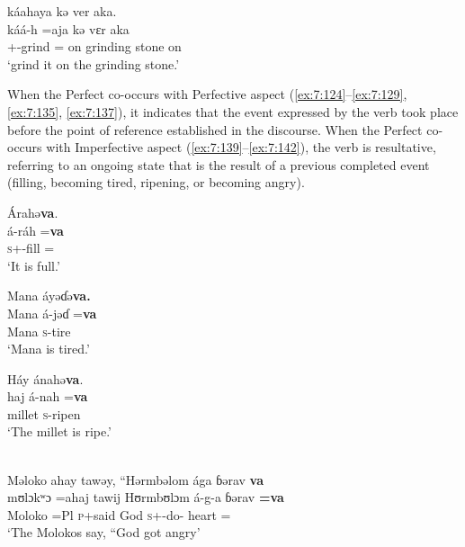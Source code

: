 \medskip
 káahaya  kə  ver  aka.\\
\gll káá-h =aja kə vɛr aka\\
     {\twoS}+{\POT}-grind  ={\PLU}  on  {grinding stone}     on\\
\glt  ‘grind it on the grinding stone.’\\
\z 

When the Perfect co-occurs with Perfective aspect (\ref{ex:7:124}--\ref{ex:7:129}, \ref{ex:7:135}, \ref{ex:7:137}), it indicates that the event expressed by the verb took place before the point of reference established in the discourse. When the Perfect co-occurs with Imperfective aspect (\ref{ex:7:139}--\ref{ex:7:142}), the verb is resultative, referring to an ongoing state that is the result of a previous completed event (filling, becoming tired, ripening, or becoming angry).

\ea\label{ex:7:139}
Árahə\textbf{va}.\\
\gll  á-ráh   =\textbf{va}\\
      \textsc{s}+{\IFV}-fill   ={\PRF}\\
\glt  ‘It is full.’\\
\z 

\ea\label{ex:7:140}
Mana  áyəɗə\textbf{va.}\\
\gll  Mana      á-jəɗ   =\textbf{va}\\
      Mana      \textsc{s}-tire  {\PRF}\\
\glt  ‘Mana is tired.’\\
\z 

\ea\label{ex:7:141}
Háy  ánahə\textbf{va}.\\
\gll  haj      á-nah   =\textbf{va}\\
      millet  \textsc{s}-ripen  {\PRF}\\
\glt  ‘The millet is ripe.’\\
\z 


\ea\label{ex:7:142}\\
Məloko  ahay  tawəy,  “Hərmbəlom  ága  ɓərav \textbf{va}\\ 
\gll  mʊlɔkʷɔ   =ahaj  tawij  Hʊrmbʊlɔm    á-g-a       ɓərav  \textbf{=va} \\  
      Moloko =Pl \textsc{p}+said God \textsc{s}+{\IFV}-do-{\CL} heart ={\PRF}\\ 
\glt ‘The Molokos say, “God got angry’\\      
      
